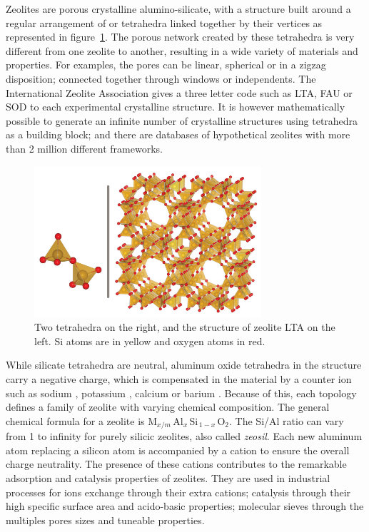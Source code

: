 \documentclass[thesis]{subfiles}
\begin{document}
Zeolites are porous crystalline alumino-silicate, with a structure built around
a regular arrangement of  or  tetrahedra linked together by
their vertices as represented in figure~\ref{fig:zeolite-building-block}. The
porous network created by these tetrahedra is very different from one zeolite to
another, resulting in a wide variety of materials and properties. For examples,
the pores can be linear, spherical or in a zigzag disposition; connected
together through windows or independents. The International Zeolite Association
gives a three letter code such as LTA, FAU or SOD to each experimental
crystalline structure. It is however mathematically possible to generate an
infinite number of crystalline structures using tetrahedra as a building block;
and there are databases of hypothetical zeolites with more than 2 million
different frameworks\cite{hypothetical-zeolites}.

\begin{figure}[ht]
    \centering
    \includegraphics[width=0.75\textwidth]{figures/cited/zeolite-building-blocks}
    \caption{Two  tetrahedra on the right, and the structure of zeolite
    LTA on the left. Si atoms are in yellow and oxygen atoms in red.}
    \label{fig:zeolite-building-block}
\end{figure}

While silicate tetrahedra  are neutral, aluminum oxide tetrahedra
 in the structure carry a negative charge, which is compensated in the
material by a counter ion such as sodium , potassium , calcium
 or barium . Because of this, each topology defines a
family of zeolite with varying chemical composition. The general chemical
formula for a zeolite is $\text{M}_{x/m}\, \text{Al}_x\, \text{Si}_{\,1-x}\,
\text{O}_2$. The Si/Al ratio can vary from 1 to infinity for purely silicic
zeolites, also called \emph{zeosil}. Each new aluminum atom replacing a silicon
atom is accompanied by a cation to ensure the overall charge neutrality. The
presence of these cations contributes to the remarkable adsorption and catalysis
properties of zeolites. They are used in industrial processes for ions exchange
through their extra cations; catalysis through their high specific surface area
and acido-basic properties; molecular sieves through the multiples pores sizes
and tuneable properties.
\end{document}
